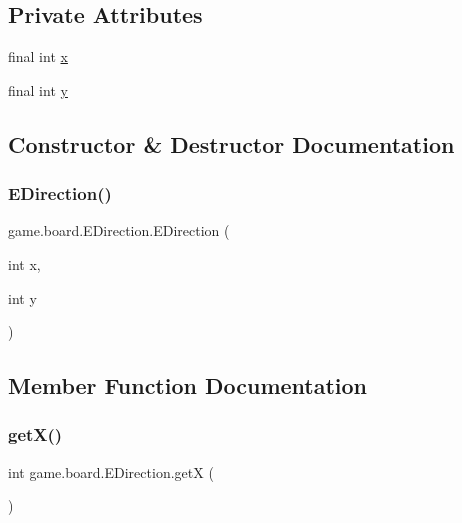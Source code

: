 \subsection*{Private Attributes}
\begin{DoxyCompactItemize}
\item 
final int \mbox{\hyperlink{enumgame_1_1board_1_1_e_direction_ae37acdcda2b9383068ffe587a17c5991}{x}}
\item 
final int \mbox{\hyperlink{enumgame_1_1board_1_1_e_direction_a6f3fc300f2b86e553a066e9a5d85a2b0}{y}}
\end{DoxyCompactItemize}


\subsection{Constructor \& Destructor Documentation}
\mbox{\label{enumgame_1_1board_1_1_e_direction_ad0ffe94ba37b3995c795079b7595e6b4}} 
\subsubsection{\texorpdfstring{E\+Direction()}{EDirection()}}
{\footnotesize\ttfamily game.\+board.\+E\+Direction.\+E\+Direction (\begin{DoxyParamCaption}\item[{int}]{x,  }\item[{int}]{y }\end{DoxyParamCaption})\hspace{0.3cm}{\ttfamily [inline]}}



\subsection{Member Function Documentation}
\mbox{\label{enumgame_1_1board_1_1_e_direction_a28cdb19c1526655a4a28989d731c0b5a}} 
\subsubsection{\texorpdfstring{get\+X()}{getX()}}
{\footnotesize\ttfamily int game.\+board.\+E\+Direction.\+getX (\begin{DoxyParamCaption}{ }\end{DoxyParamCaption})\hspace{0.3cm}{\ttfamily [inline]}}

